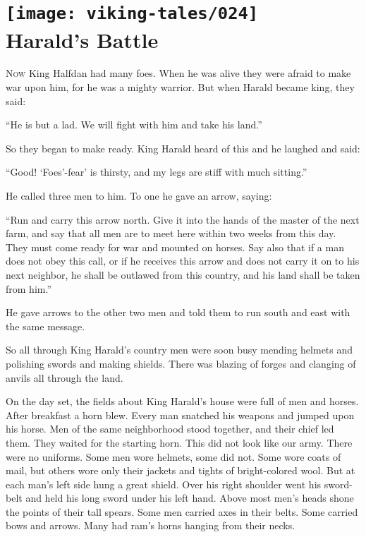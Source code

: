 \chapter[Harald's Battle]{
    \texttt{[image: viking-tales/024]}\\
    Harald's Battle}

\lettrine{N}{ow} King Halfdan had many foes. When he was alive they were
afraid to make war upon him, for he was a mighty warrior. But when Harald
became king, they said:

``He is but a lad. We will fight with him and take his land.''

So they began to make ready. King Harald heard of this and he laughed
and said:

``Good! `Foes'-fear' is thirsty, and my legs are stiff with much
sitting.''

He called three men to him. To one he gave an arrow, saying:

``Run and carry this arrow north. Give it into the hands of the master
of the next farm, and say that all men are to meet here within two weeks
from this day. They must come ready for war and mounted on horses. Say
also that if a man does not obey this call, or if he receives this arrow
and does not carry it on to his next neighbor, he shall be outlawed from
this country, and his land shall be taken from him.''

He gave arrows to the other two men and told them to run south and east
with the same message.

So all through King Harald's country men were soon busy mending helmets
and polishing swords and making shields. There was blazing of forges and
clanging of anvils all through the land.

On the day set, the fields about King Harald's house were full of men
and horses. After breakfast a horn blew. Every man snatched his weapons
and jumped upon his horse. Men of the same neighborhood stood together,
and their chief led them. They waited for the starting horn. This did
not look like our army. There were no uniforms. Some men wore helmets,
some did not. Some wore coats of mail, but others wore only their
jackets and tights of bright-colored wool. But at each man's left side
hung a great shield. Over his right shoulder went his sword-belt and
held his long sword under his left hand. Above most men's heads shone
the points of their tall spears. Some men carried axes in their belts.
Some carried bows and arrows. Many had ram's horns hanging from their
necks.

